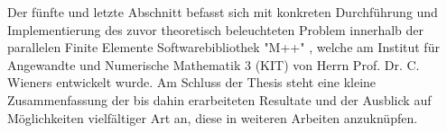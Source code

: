 Der fünfte und letzte Abschnitt befasst sich mit konkreten Durchführung und Implementierung des zuvor theoretisch beleuchteten Problem innerhalb der parallelen Finite Elemente Softwarebibliothek "M++" \cite{siteM++},
welche am Institut für Angewandte und Numerische Mathematik 3 (KIT) von Herrn Prof. Dr. C. Wieners entwickelt wurde. \newline
Am Schluss der Thesis steht eine kleine Zusammenfassung der bis dahin erarbeiteten Resultate und der Ausblick auf Möglichkeiten vielfältiger Art an, diese in weiteren Arbeiten anzuknüpfen.